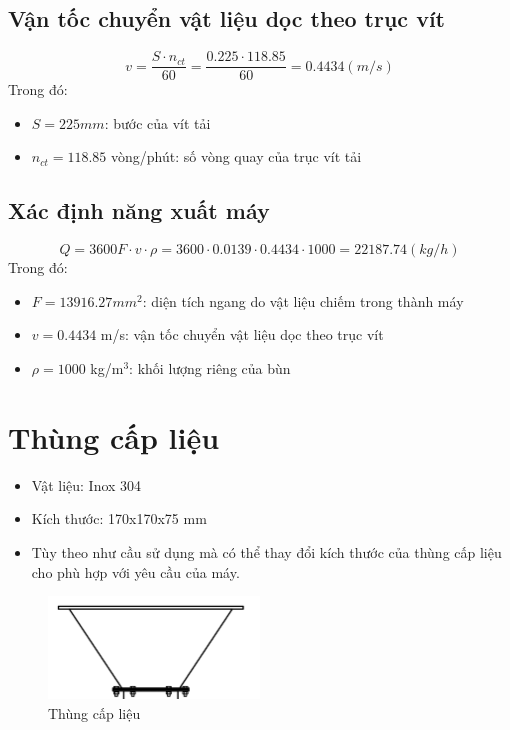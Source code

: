 \subsection{Vận tốc chuyển vật liệu dọc theo trục vít}
\[
    v = \frac{S\cdot n_{ct}}{60} = \frac{0.225\cdot 118.85}{60} = 0.4434 (m/s)
\]
Trong đó: 
\begin{itemize}
    \item $S = 225 mm$: bước của vít tải
    \item $n_{ct} = 118.85$ vòng/phút: số vòng quay của trục vít tải
\end{itemize}
\subsection{Xác định năng xuất máy}
\[
    Q = 3600F\cdot v\cdot \rho = 3600\cdot 0.0139\cdot 0.4434\cdot 1000 = 22187.74 (kg/h)
\]
Trong đó:
\begin{itemize}
    \item $F = 13916.27 mm^2$: diện tích ngang do vật liệu chiếm trong thành máy
    \item $v = 0.4434$ m/s: vận tốc chuyển vật liệu dọc theo trục vít
    \item $\rho = 1000$ kg/m$^3$: khối lượng riêng của bùn
\end{itemize}
\section{Thùng cấp liệu}
\begin{itemize}
    \item Vật liệu: Inox 304
    \item Kích thước: 170x170x75 mm
    \item Tùy theo như cầu sử dụng mà có thể thay đổi kích thước của thùng cấp liệu cho phù hợp với yêu cầu của máy.
\end{itemize}
\begin{figure}[H]
    \centering
    \includegraphics[width=0.5\textwidth]{pictures/thungcap.png}
    \caption{Thùng cấp liệu}
\end{figure}

